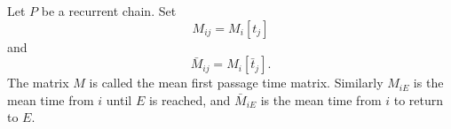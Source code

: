 Let $P$ be a recurrent chain. Set
$$M_{ij} = M_i[t_j]$$
and
$$\bar{M}_{ij} = M_i[\bar{t}_j].$$
The matrix $M$ is called the mean first passage time matrix. Similarly $M_{iE}$ is the mean time from $i$ until $E$ is reached, and $\bar{M}_{iE}$ is the mean time from $i$ to return to $E$.
